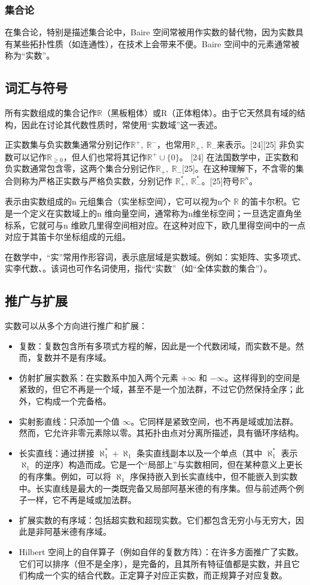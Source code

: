 \subsubsection{集合论}
在集合论，特别是描述集合论中，Baire 空间常被用作实数的替代物，因为实数具有某些拓扑性质（如连通性），在技术上会带来不便。Baire 空间中的元素通常被称为“实数”。
\subsection{词汇与符号}
所有实数组成的集合记作$\mathbb{R}$（黑板粗体）或R（正体粗体）。由于它天然具有域的结构，因此在讨论其代数性质时，常使用“实数域”这一表述。

正实数集与负实数集通常分别记作$\mathbb{R}^{+}, \ \mathbb{R}^{-}$，也常用$
\mathbb{R}_{+}, \ \mathbb{R}_{-}$来表示。[24][25] 非负实数可以记作$\mathbb{R}_{\geq 0}$，但人们也常将其记作$\mathbb{R}^{+} \cup \{0\}$。
[24]  在法国数学中，正实数和负实数通常包含零，这两个集合分别记作$\mathbb{R}_{+}, \ \mathbb{R}_{-}$[25]。在这种理解下，不含零的集合则称为严格正实数与严格负实数，分别记作  $\mathbb{R}_{+}^{*}, \ \mathbb{R}_{-}^{*}$。[25]符号$\mathbb{R}^{n}$。

表示由实数组成的n 元组集合（实坐标空间），它可以视为n个 $\mathbb{R}$ 的笛卡尔积。它是一个定义在实数域上的n 维向量空间，通常称为n维坐标空间；一旦选定直角坐标系，它就可与n 维欧几里得空间相对应。在这种对应下，欧几里得空间中的一点对应于其笛卡尔坐标组成的元组。

在数学中，“实”常用作形容词，表示底层域是实数域。例如：实矩阵、实多项式、实李代数、。该词也可作名词使用，指代“实数”（如“全体实数的集合”）。
\subsection{推广与扩展}
实数可以从多个方向进行推广和扩展：
\begin{itemize}
\item 复数：复数包含所有多项式方程的解，因此是一个代数闭域，而实数不是。然而，复数并不是有序域。
\item 仿射扩展实数系：在实数系中加入两个元素 $+\infty$ 和 $-\infty$。这样得到的空间是紧致的，但它不再是一个域，甚至不是一个加法群，不过它仍然保持全序；此外，它构成一个完备格。
\item 实射影直线：只添加一个值 $\infty$。它同样是紧致空间，也不再是域或加法群。然而，它允许非零元素除以零。其拓扑由点对分离所描述，具有循环序结构。
\item 长实直线：通过拼接 $\aleph_{1}^{*} + \aleph_{1}$ 条实直线副本以及一个单点（其中 $\aleph_{1}^{*}$ 表示 $\aleph_{1}$ 的逆序）构造而成。它是一个“局部上”与实数相同，但在某种意义上更长的有序集。例如，可以将 $\aleph_{1}$ 序保持嵌入到长实直线中，但不能嵌入到实数中。长实直线是最大的一类既完备又局部阿基米德的有序集。但与前述两个例子一样，它不再是域或加法群。
\item 扩展实数的有序域：包括超实数和超现实数。它们都包含无穷小与无穷大，因此是非阿基米德有序域。
\item Hilbert 空间上的自伴算子（例如自伴的复数方阵）：在许多方面推广了实数。它们可以排序（但不是全序），是完备的，且其所有特征值都是实数，并且它们构成一个实的结合代数。正定算子对应正实数，而正规算子对应复数。
\end{itemize}
